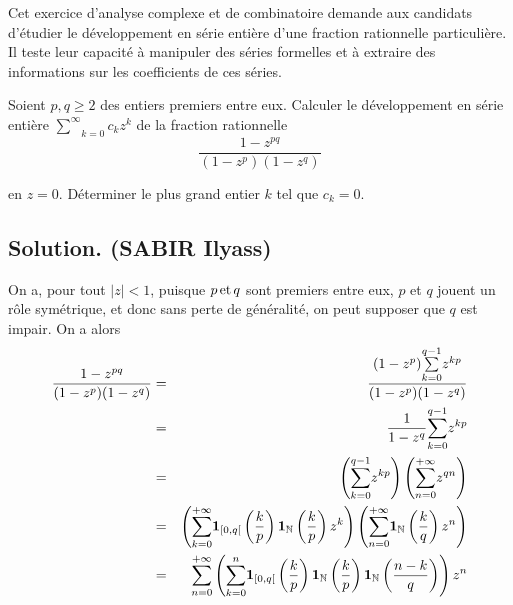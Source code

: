 Cet exercice d'analyse complexe et de combinatoire demande aux candidats
d'{\'e}tudier le d{\'e}veloppement en s{\'e}rie enti{\`e}re d'une fraction
rationnelle particuli{\`e}re. Il teste leur capacit{\'e} {\`a} manipuler des
s{\'e}ries formelles et {\`a} extraire des informations sur les coefficients
de ces s{\'e}ries.
\begin{exercise}[]
Soient $p, q \geq 2$ des entiers premiers entre eux. Calculer le
d{\'e}veloppement en s{\'e}rie enti{\`e}re $\underset{k =
0}{\overset{\infty}{\sum}} c_k z^k$ de la fraction rationnelle
\[ \frac{1 - z^{p q}}{(1 - z^p) (1 - z^q)} \]


en $z = 0$. D{\'e}terminer le plus grand entier $k$ tel que $c_k = 0$.

\end{exercise}

\subsection*{Solution. (SABIR Ilyass)}


On a, pour tout $| z | < 1$, puisque $p \operatorname{et} q$ sont premiers entre eux,
$p$ et $q$ jouent un r{\^o}le sym{\'e}trique, et donc sans perte de
g{\'e}n{\'e}ralit{\'e}, on peut supposer que $q$ est impair. On a alors
\begin{eqnarray*}
  \frac{1 - z^{p q}}{(1 - z^p) (1 - z^q)} & = & \frac{(1 - z^p) \underset{k =
  0}{\overset{q - 1}{\sum}} z^{k p}}{(1 - z^p) (1 - z^q)}\\
  & = & \frac{1}{1 - z^q} \underset{k = 0}{\overset{q - 1}{\sum}} z^{k p}\\
  & = & \left( \underset{k = 0}{\overset{q - 1}{\sum}} z^{k p} \right) \left(
  \underset{n = 0}{\overset{+ \infty}{\sum}} z^{q n} \right)\\
  & = & \left( \underset{k = 0}{\overset{+ \infty}{\sum}} \boldsymbol{1}_{[0, q
  [} \left( \frac{k}{p} \right) \boldsymbol{1}_{\mathbb{N}} \left( \frac{k}{p}
  \right) z^k \right) \left( \underset{n = 0}{\overset{+ \infty}{\sum}}
  \boldsymbol{1}_{\mathbb{N}} \left( \frac{k}{q} \right) z^n \right)\\
  & = & \underset{n = 0}{\overset{+ \infty}{\sum}} \left( \underset{k =
  0}{\overset{n}{\sum}} \boldsymbol{1}_{[0, q [} \left( \frac{k}{p} \right)
  \boldsymbol{1}_{\mathbb{N}} \left( \frac{k}{p} \right)
  \boldsymbol{1}_{\mathbb{N}} \left( \frac{n - k}{q} \right) \right) z^n
\end{eqnarray*}


